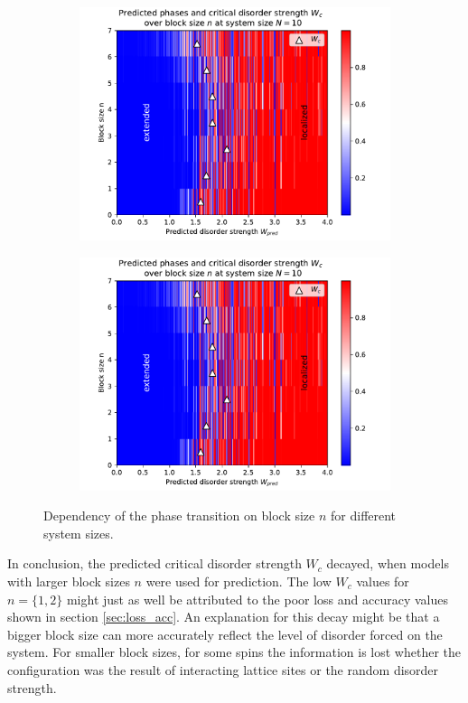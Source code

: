 \documentclass[reprint,amsmath,amssymb,aps,prb]{revtex4-2}
\begin{document}
\begin{center}
\begin{figure}[H]
\begin{subfigure}[c]{0.45\textwidth}
			\includegraphics[width=\textwidth]{../results/Wc/N10_Wc_n_dependency.pdf}
		\end{subfigure}
		\begin{subfigure}[c]{0.45\textwidth}
			\includegraphics[width=\textwidth]{../results/Wc/N10_Wc_n_dependency.pdf}
		\end{subfigure}%
		\caption{Dependency of the phase transition on block size $n$ for different system sizes.}
		\label{fig:wcextractn}
	\end{figure}
\end{center}
\twocolumngrid

In conclusion, the predicted critical disorder strength $W_c$ decayed, when models with larger block sizes $n$ were used for prediction. The low $W_c$ values for $n=\{1,2\}$ might just as well be attributed to the poor loss and accuracy values shown in section \ref{sec:loss_acc}. An explanation for this decay might be that a bigger block size can more accurately reflect the level of disorder forced on the system. For smaller block sizes, for some spins the information is lost whether the configuration was the result of interacting lattice sites or the random disorder strength.
\end{document}
